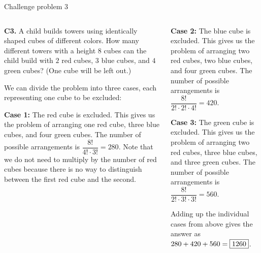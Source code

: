 \documentclass[9pt,aspectratio=169]{beamer}
\begin{document}
\begin{frame}{Challenge problem 3}
  \begin{columns}[T]
    \begin{column}{0.5\textwidth}
      \begin{problem}
        \textbf{C3.} A child builds towers using identically shaped cubes of different colors. How many different towers with a height $8$ cubes can the child build with $2$ red cubes, $3$ blue cubes, and $4$ green cubes? (One cube will be left out.)
      \end{problem}
      We can divide the problem into three cases, each representing one cube to be excluded:

      \textbf{Case 1:} The red cube is excluded. This gives us the problem of arranging one red cube, three blue cubes, and four green cubes. The number of possible arrangements is $\dfrac{8!}{4!\cdot3!}=280$. Note that we do not need to multiply by the number of red cubes because there is no way to distinguish between the first red cube and the second.
    \end{column}
    \begin{column}{0.5\textwidth}
      \textbf{Case 2:} The blue cube is excluded. This gives us the problem of arranging two red cubes, two blue cubes, and four green cubes. The number of possible arrangements is $\dfrac{8!}{2!\cdot2!\cdot4!}=420$.

      \textbf{Case 3:} The green cube is excluded. This gives us the problem of arranging two red cubes, three blue cubes, and three green cubes. The number of possible arrangements is $\dfrac{8!}{2!\cdot3!\cdot3!}=560$.

      Adding up the individual cases from above gives the answer as $280+420+560=\fbox{1260}$.
    \end{column}
  \end{columns}
\end{frame}
\end{document}
